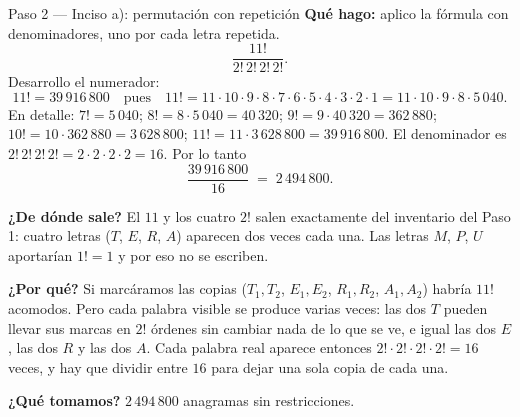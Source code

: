 \documentclass[11pt]{article}
\begin{document}
\begin{paso}{Paso 2 --- Inciso a): permutación con repetición}
\textbf{Qué hago:} aplico la fórmula con denominadores, uno por cada letra repetida.
\[
\frac{11!}{2!\,2!\,2!\,2!} .
\]
Desarrollo el numerador:
\[
11! = 39\,916\,800
\quad\text{pues}\quad
11!=11\cdot 10\cdot 9\cdot 8\cdot 7\cdot 6\cdot 5\cdot 4\cdot 3\cdot 2\cdot 1
= 11\cdot 10\cdot 9\cdot 8\cdot 5\,040 .
\]
En detalle: $7!=5\,040$; $8!=8\cdot 5\,040=40\,320$; $9!=9\cdot 40\,320=362\,880$;
$10!=10\cdot 362\,880=3\,628\,800$; $11!=11\cdot 3\,628\,800=39\,916\,800$. El denominador es
$2!\,2!\,2!\,2!=2\cdot2\cdot2\cdot2=16$. Por lo tanto
\[
\frac{39\,916\,800}{16} \;=\; 2\,494\,800 .
\]

\textbf{¿De dónde sale?} El $11$ y los cuatro $2!$ salen exactamente del inventario del Paso 1: cuatro
letras ($T$, $E$, $R$, $A$) aparecen dos veces cada una. Las letras $M$, $P$, $U$ aportarían $1!=1$ y por eso
no se escriben.

\textbf{¿Por qué?} Si marcáramos las copias ($T_1,T_2$, $E_1,E_2$, $R_1,R_2$, $A_1,A_2$) habría $11!$
acomodos. Pero cada palabra visible se produce varias veces: las dos $T$ pueden llevar sus marcas en $2!$
órdenes sin cambiar nada de lo que se ve, e igual las dos $E$, las dos $R$ y las dos $A$. Cada palabra real
aparece entonces $2!\cdot2!\cdot2!\cdot2!=16$ veces, y hay que dividir entre $16$ para dejar una sola copia
de cada una.

\textbf{¿Qué tomamos?} $2\,494\,800$ anagramas sin restricciones.
\end{paso}
\end{document}
